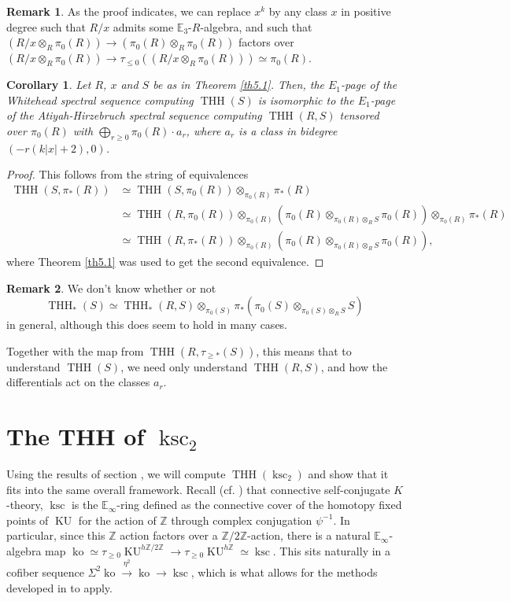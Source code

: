 \documentclass[11pt,leqno]{article}
\newcommand{\zz}{\mathbb{Z}}
\newcommand{\bb}[1]{\mathbb{#1}}
\DeclareMathOperator{\THH}{THH}
\DeclareMathOperator{\ksc}{ksc}
\DeclareMathOperator{\ko}{ko}
\newcommand{\mo}[1]{\operatorname{#1}}
\newtheorem*{short hand}{theorem name}
\theoremstyle{plain}  %
\newtheorem{corollary}{Corollary}[section]
\theoremstyle{definition}
\newtheorem{remark}{Remark}[section]
\numberwithin{equation}{section}
\begin{document}
\begin{remark}\label{rem5.2}  As the proof indicates, we can replace $x^k$ by any class $x$ in positive degree such that $R/x$ admits some $\bb{E}_3$-$R$-algebra, and such that $(R/x\otimes_{R}\pi_0(R))\to (\pi_0(R) \otimes_R \pi_0(R))$ factors over $(R/x\otimes_{R}\pi_0(R))\to \tau_{\leq 0}((R/x\otimes_{R}\pi_0(R)))\simeq\pi_0(R)$.
	\end{remark}
\begin{corollary}\label{cor5.3}
	Let $R$, $x$ and $S$ be as in Theorem \ref{th5.1}.  Then, the $E_1$-page of the Whitehead spectral sequence computing $\THH(S)$ is isomorphic to the $E_1$-page of the Atiyah-Hirzebruch spectral sequence computing $\THH(R,S)$ tensored over $\pi_0(R)$ with $\bigoplus_{r\geq 0}\pi_0(R)\cdot a_r$, where $a_r$ is a class in bidegree $(-r(k|x|+2),0)$.
\end{corollary}
\begin{proof}
This follows from the string of equivalences
\begin{align*}
\THH(S,\pi_*(R))&\simeq \THH(S,\pi_0(R))\otimes_{\pi_0(R)} \pi_*(R)\\
&\simeq \THH(R,\pi_0(R))\otimes_{\pi_0(R)}(\pi_0(R) \otimes_{\pi_0(R) \otimes_{R} S}\pi_0(R))\otimes_{\pi_0(R)}\pi_*(R)\\
&\simeq \THH(R,\pi_*(R))\otimes_{\pi_0(R)}(\pi_0(R) \otimes_{\pi_0(R) \otimes_{R} S}\pi_0(R)),
\end{align*}
where Theorem \ref{th5.1} was used to get the second equivalence.
\end{proof}
\begin{remark}\label{rem5.4}  We don't know whether or not $$\THH_*(S)\simeq \THH_*(R,S)\otimes_{\pi_0(S)} \pi_*(\pi_0(S)\otimes_{\pi_0(S)\otimes_{R}S}S)$$ in general, although this does seem to hold in many cases.
\end{remark}
Together with the map from $\THH(R,\tau_{\geq *}(S))$, this means that to understand $\THH(S)$, we need only understand $\THH(R,S)$, and how the differentials act on the classes $a_r$.






\newpage
\section{The THH of $\ksc_2$}
Using the results of section , we will compute $\THH(\ksc_2)$ and show that it fits into the same overall framework.  Recall (cf. \cite{BOUSFIELD1990121}) that connective self-conjugate $K$-theory, $\ksc$ is the $\bb{E}_{\infty}$-ring defined as the connective cover of the homotopy fixed points of $\mo{KU}$ for the action of $\zz$ through complex conjugation $\psi^{-1}$.  In particular, since this $\zz$ action factors over a $\zz/2\zz$-action, there is a natural $\bb{E}_{\infty}$-algebra map $\ko\simeq \tau_{\geq 0}\mo{KU}^{h\zz/2\zz}\to \tau_{\geq 0}\mo{KU}^{h\zz}\simeq \ksc$.  This sits naturally in a cofiber sequence $\Sigma^2\ko\xrightarrow{\eta^2}\ko\to \ksc$, which is what allows for the methods developed in  to apply.
\end{document}
